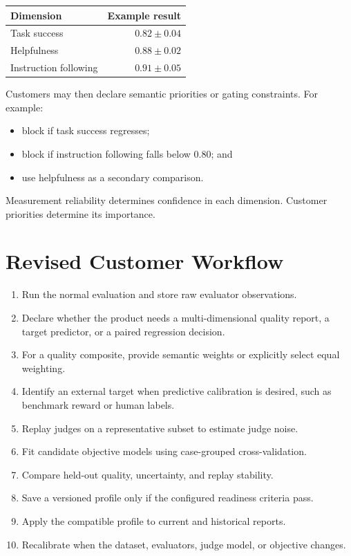 \documentclass[11pt]{article}
\begin{document}
\begin{center}
\begin{tabular}{lr}
\toprule
Dimension & Example result \\
\midrule
Task success & \(0.82 \pm 0.04\) \\
Helpfulness & \(0.88 \pm 0.02\) \\
Instruction following & \(0.91 \pm 0.05\) \\
\bottomrule
\end{tabular}
\end{center}

Customers may then declare semantic priorities or gating constraints. For
example:

\begin{itemize}
    \item block if task success regresses;
    \item block if instruction following falls below 0.80; and
    \item use helpfulness as a secondary comparison.
\end{itemize}

Measurement reliability determines confidence in each dimension. Customer
priorities determine its importance.

\section{Revised Customer Workflow}

\begin{enumerate}
    \item Run the normal evaluation and store raw evaluator observations.
    \item Declare whether the product needs a multi-dimensional quality report,
    a target predictor, or a paired regression decision.
    \item For a quality composite, provide semantic weights or explicitly
    select equal weighting.
    \item Identify an external target when predictive calibration is desired,
    such as benchmark reward or human labels.
    \item Replay judges on a representative subset to estimate judge noise.
    \item Fit candidate objective models using case-grouped cross-validation.
    \item Compare held-out quality, uncertainty, and replay stability.
    \item Save a versioned profile only if the configured readiness criteria
    pass.
    \item Apply the compatible profile to current and historical reports.
    \item Recalibrate when the dataset, evaluators, judge model, or objective
    changes.
\end{enumerate}
\end{document}
